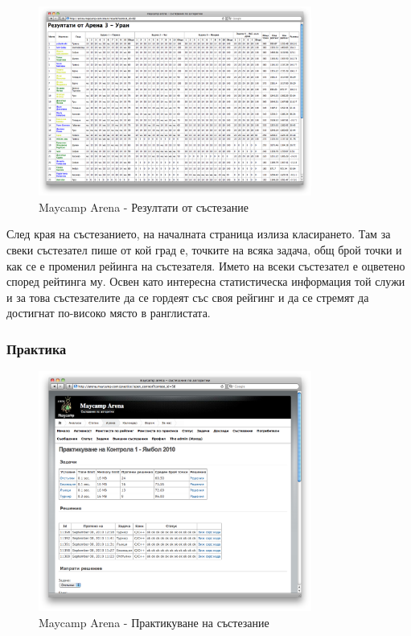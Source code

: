 \documentclass[a4paper,12pt]{article}
\begin{document}
  \begin{figure}[ht]
    \begin{center}
      \includegraphics[width=0.8\textwidth]{images/maycamp_arena_results.png}
    \end{center}
    \caption{Maycamp Arena - Резултати от състезание}
    \label{arena_results}
  \end{figure}
  
  След края на състезанието, на началната страница излиза класирането. Там за свеки състезател пише от кой град е, точките на всяка задача, общ брой точки и как се е променил рейинга на състезателя. Името на всеки състезател е оцветено според рейтинга му. Освен като интересна статистическа информация той служи и за това състезателите да се гордеят със своя рейгинг и да се стремят да достигнат по-високо място в ранглистата.
  
  \pagebreak

  \subsubsection{Практика}

  \begin{figure}[ht]
    \begin{center}
      \includegraphics[width=0.8\textwidth]{images/maycamp_arena_practice.png}
    \end{center}
    \caption{Maycamp Arena - Практикуване на състезание}
    \label{arena_practice}
  \end{figure}
  
\end{document}
